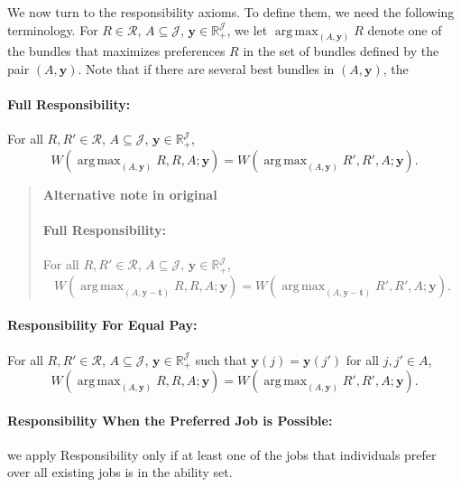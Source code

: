 \documentclass[12pt,thmsb]{article}
\DeclareMathOperator*{\argmax}{arg\,max}
\begin{document}
We now turn to the responsibility axioms. To define them, we need the following terminology. For $R\in \mathcal{R}$, $A\subseteq \mathcal{J}$, $\mathbf{y} \in \mathbb{R}_{+}^{\mathcal{J}}$, we let $\argmax_{(A,\mathbf{y})}R$ denote one of the bundles that maximizes preferences $R$ in the set of bundles defined by the pair $(A,\mathbf{y})$. Note that if there are several best bundles in $(A,\mathbf{y})$, the

\paragraph{Full Responsibility:} For all $R,R'\in \mathcal{R}$, $A\subseteq \mathcal{J}$, $\mathbf{y} \in \mathbb{R}_{+}^{\mathcal{J}}$,
\begin{equation*}
W(\argmax_{(A,\mathbf{y})}R,R,A;\mathbf{y})=W(\argmax_{(A,\mathbf{y})}R',R',A;\mathbf{y}).
\end{equation*}

\begin{quote}
\textbf{Alternative note in original}

\paragraph{Full Responsibility:} For all $R,R'\in \mathcal{R}$, $A\subseteq \mathcal{J}$, $\mathbf{y} \in \mathbb{R}_{+}^{\mathcal{J}}$,
\begin{equation*}
W(\argmax_{(A,\mathbf{y-t})}R,R,A;\mathbf{y})=W(\argmax_{(A,\mathbf{y -t })}R',R',A;\mathbf{y}).
\end{equation*}
\end{quote}

\paragraph{Responsibility For Equal Pay:} For all $R,R'\in \mathcal{R}$, $A\subseteq \mathcal{J}$, $\mathbf{y} \in \mathbb{R}_{+}^{\mathcal{J}}$ such that $\mathbf{y}(j)=\mathbf{y}(j')$ for all $j,j'\in A$,
\begin{equation*}
W(\argmax_{(A,\mathbf{y})}R,R,A;\mathbf{y})=W(\argmax_{(A,\mathbf{y})}R',R',A;\mathbf{y}).
\end{equation*}

\paragraph{Responsibility When the Preferred Job is Possible:} we apply Responsibility only if at least one of the jobs that individuals prefer over all existing jobs is in the ability set.
\end{document}
